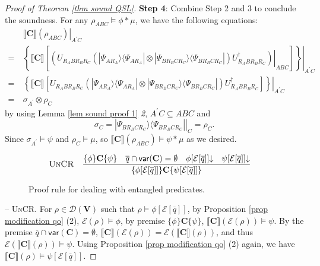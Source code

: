 \documentclass[conference,compsoc, 10pt]{IEEEtran}
\newcommand {\qbar} {{\overline{q}}}
\newcommand {\cD } {{\mathcal{D}}}
\newcommand {\cE } {{\mathcal{E}}}
\newcommand{\Mexist}{{\downarrow}}
\newcommand {\rt }[2] {{\left.{#1}\right|_{#2}}}
\newcommand {\vars } {\mathbf{V}}
\newcommand {\var } {\mathsf{var}}
\newcommand {\prog } {{\mathbf{C}}}
\newcommand {\sem}[1] {\llbracket#1\rrbracket}
\def\>{\ensuremath{\rangle}}
\def\<{\ensuremath{\langle}}
\newcommand{\proj}{{\mathrm{proj}}}
\begin{document}
\begin{appendices}
\begin{proof}[Proof of Theorem \ref{thm sound QSL}]
			\noindent\textbf{Step 4}: Combine Step 2 and 3 to conclude the soundness. For any $\rho_{ABC}\models\phi\ast\mu$, we have the following equations:
			\begin{align*}
			&\rt{\sem{\prog}(\rho_{ABC})}{A^\prime C} \\
			=\ &\rt{\left\{\sem{\prog}\left[\rt{\left(U_{R_ABR_BR_C}(|\Psi_{AR_A}\>\<\Psi_{AR_A}|\otimes|\Psi_{BR_BCR_C}\>\<\Psi_{BR_BCR_C}|)U^\dag_{R_ABR_BR_C}\right)}{ABC}\right]\right\}}{A^\prime C} \\
			=\ &\rt{\left\{\sem{\prog}\left[U_{R_ABR_BR_C}(|\Psi_{AR_A}\>\<\Psi_{AR_A}|\otimes|\Psi_{BR_BCR_C}\>\<\Psi_{BR_BCR_C}|)U^\dag_{R_ABR_BR_C}\right]\right\}}{A^\prime C} \\
			=\ &\sigma_{A^\prime}\otimes\rho_C
			\end{align*}
			by using Lemma \ref{lem sound proof 1} \textit{2}, $A^\prime C\subseteq ABC$ and 
			$$\sigma_C = \rt{|\Psi_{BR_BCR_C}\>\<\Psi_{BR_BCR_C}|}{C} = \rho_C.$$
			Since $\sigma_{A^\prime} \models \psi$ and $\rho_C\models\mu$, so $\sem{\prog}(\rho_{ABC})\models \psi\ast\mu$ as we desired.
			
			
			\begin{figure}[h]\centering
				\begin{equation*}\begin{split}
				&\textsc{UnCR}\quad \frac{\{\phi\}\prog\{\psi\}\quad\qbar\cap\var(\prog)=\emptyset\quad\phi[\cE[\qbar]]\Mexist\quad\psi[\cE[\qbar]]\Mexist}{\{\phi[\cE[\qbar]]\}\prog\{\psi[\cE[\qbar]]\}} 		
				\end{split}%
				\end{equation*}
				\caption{Proof rule for dealing with entangled predicates. %
				}
			\end{figure}
			
			\vspace{0.4cm}
			
			\noindent -- \textsc{UnCR}. For $\rho\in\cD(\vars)$ such that $\rho\models\phi[\cE[\qbar]]$, by Proposition \ref{prop modification qo} (2), $\cE(\rho)\models\phi$, by premise $\{\phi\}\prog\{\psi\}$, $\sem{\prog}(\cE(\rho))\models\psi$. By the premise $\qbar\cap\var(\prog)=\emptyset$, 
			$\sem{\prog}(\cE(\rho)) = \cE(\sem{\prog}(\rho))$, and thus $\cE(\sem{\prog}(\rho))\models\psi$. Using Proposition \ref{prop modification qo} (2) again, we have $\sem{\prog}(\rho)\models\psi[\cE[\qbar]]$.
			

\end{proof}
\end{appendices}
\end{document}
